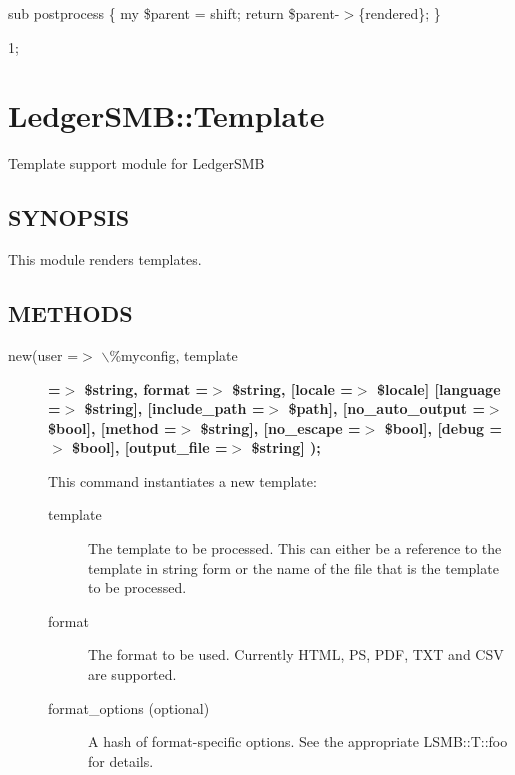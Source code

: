 \begin{description}
\begin{description}
\begin{description}
\begin{description}
\begin{description}
\begin{description}
\begin{description}
\begin{description}
\begin{description}
\begin{description}
sub postprocess \{
	my \$parent = shift;
	return \$parent-$>$\{rendered\};
\}



1;

\section{LedgerSMB::Template\label{LedgerSMB::Template}}


Template support module for LedgerSMB

\subsection*{SYNOPSIS\label{LedgerSMB::Template_SYNOPSIS}}


This module renders templates.

\subsection*{METHODS\label{LedgerSMB::Template_METHODS}}
\begin{description}

\item[{new(user =$>$ $\backslash$\%myconfig, template}] \textbf{=$>$ \$string, format =$>$ \$string, [locale =$>$ \$locale] [language =$>$ \$string], [include\_path =$>$ \$path], [no\_auto\_output =$>$ \$bool], [method =$>$ \$string], [no\_escape =$>$ \$bool], [debug =$>$ \$bool], [output\_file =$>$ \$string] );}

This command instantiates a new template:

\begin{description}

\item[{template}] \mbox{}

The template to be processed.  This can either be a reference to the template
in string form or the name of the file that is the template to be processed.


\item[{format}] \mbox{}

The format to be used.  Currently HTML, PS, PDF, TXT and CSV are supported.


\item[{format\_options (optional)}] \mbox{}

A hash of format-specific options.  See the appropriate LSMB::T::foo for
details.



\end{description}
\end{description}
\end{description}
\end{description}
\end{description}
\end{description}
\end{description}
\end{description}
\end{description}
\end{description}
\end{description}
\end{description}
